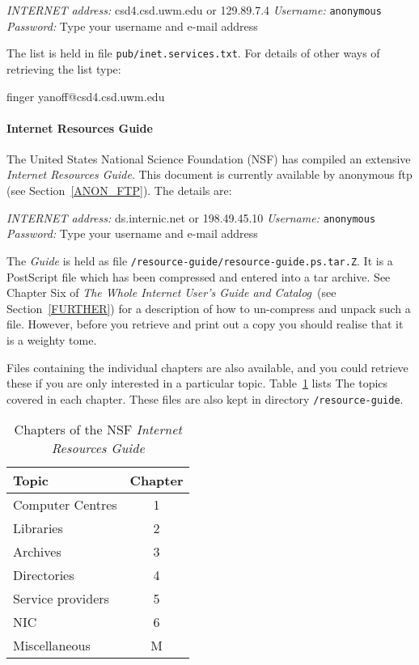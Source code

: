 \documentclass[twoside,11pt,nolof]{starlink}
\begin{document}
\textit{INTERNET address: } csd4.csd.uwm.edu or 129.89.7.4
\newline \textit{Username:} \verb-anonymous-
\newline \textit{Password:} Type your username and e-mail address

The list is held in file \texttt{pub/inet.services.txt}. For details
of other ways of retrieving the list type:

\begin{terminalv}
finger  yanoff@csd4.csd.uwm.edu
\end{terminalv}

\paragraph{Internet Resources Guide}

The United States National Science Foundation (NSF) has compiled
an extensive \textit{Internet Resources Guide}. This document is currently
available by anonymous ftp (see Section~\ref{ANON_FTP}). The
details are:

\textit{INTERNET address:} ds.internic.net or 198.49.45.10
\newline \textit{Username:} \verb-anonymous-
\newline \textit{Password:} Type your username and e-mail address

The \textit{Guide} is held as file \texttt{/resource-guide/resource-guide.ps.tar.Z}. It is a PostScript file
which has been compressed and entered into a tar archive. See
Chapter Six of \textit{The Whole Internet User's Guide and Catalog}\,
(see Section~\ref{FURTHER}) for a description of how to un-compress
and unpack such a file. However, before  you retrieve and print
out a copy you should realise that it is a weighty tome.

Files containing the individual chapters are also available, and you
could retrieve these if you are only interested in a particular topic.
Table~\ref{IRG_CHAP} lists The topics covered in each chapter. These
files are also kept in directory \texttt{/resource-guide}.

\begin{table}[htbp]

\begin{center}
\begin{tabular}{lc}
Topic             & Chapter  \\ \hline
Computer Centres  & 1  \\
Libraries         & 2  \\
Archives          & 3  \\
Directories       & 4  \\
Service providers & 5  \\
NIC               & 6  \\
Miscellaneous     & M  \\
\end{tabular}
\end{center}

\caption{Chapters of the NSF \textit{Internet Resources Guide}}
\label{IRG_CHAP}

\end{table}
\end{document}
